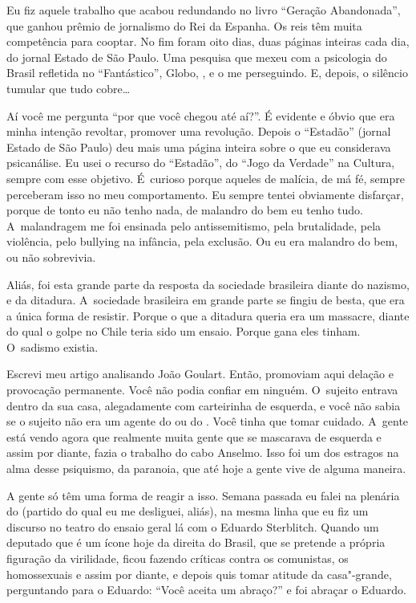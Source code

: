 Eu fiz aquele trabalho que acabou redundando no livro ``Geração
Abandonada'', que ganhou prêmio de jornalismo do Rei da Espanha. Os reis
têm muita competência para cooptar. No fim foram oito dias, duas páginas
inteiras cada dia, do jornal Estado de São Paulo. Uma pesquisa que mexeu
com a psicologia do Brasil refletida no ``Fantástico'',  Globo, ,
e o  me perseguindo. E, depois, o silêncio tumular que tudo
cobre…

 

Aí você me pergunta ``por que você chegou até aí?''. É evidente e óbvio
que era minha intenção revoltar, promover uma revolução. Depois o
``Estadão'' (jornal Estado de São Paulo) deu mais uma página inteira
sobre o que eu considerava psicanálise. Eu usei o recurso do
``Estadão'', do ``Jogo da Verdade'' na  Cultura, sempre com esse
objetivo. É~curioso porque aqueles de malícia, de má fé, sempre
perceberam isso no meu comportamento. Eu sempre tentei obviamente
disfarçar, porque de tonto eu não tenho nada, de malandro do bem eu
tenho tudo. A~malandragem me foi ensinada pelo antissemitismo, pela
brutalidade, pela violência, pelo bullying na infância, pela exclusão.
Ou eu era malandro do bem, ou não sobrevivia.

 

Aliás, foi esta grande parte da resposta da sociedade brasileira diante
do nazismo, e da ditadura. A~sociedade brasileira em grande parte se
fingiu de besta, que era a única forma de resistir. Porque o que a
ditadura queria era um massacre, diante do qual o golpe no Chile teria
sido um ensaio. Porque gana eles tinham. O~sadismo existia.

 

Escrevi meu artigo analisando João Goulart. Então, promoviam aqui delação
e provocação permanente. Você não podia confiar em ninguém. O~sujeito
entrava dentro da sua casa, alegadamente com carteirinha de esquerda, e
você não sabia se o sujeito não era um agente do  ou do . Você
tinha que tomar cuidado. A~gente está vendo agora que realmente muita
gente que se mascarava de esquerda e assim por diante, fazia o trabalho
do cabo Anselmo. Isso foi um dos estragos na alma desse psiquismo, da
paranoia, que até hoje a gente vive de alguma maneira.

 

A gente só têm uma forma de reagir a isso. Semana passada eu falei na
plenária do  (partido do qual eu me desliguei, aliás), na mesma linha
que eu fiz um discurso no teatro do ensaio geral lá com o Eduardo
Sterblitch. Quando um deputado que é um ícone hoje da direita do Brasil,
que se pretende a própria figuração da virilidade, ficou fazendo
críticas contra os comunistas, os homossexuais e assim por diante, e
depois quis tomar atitude da casa"-grande, perguntando para o Eduardo:
``Você aceita um abraço?'' e foi abraçar o Eduardo.

